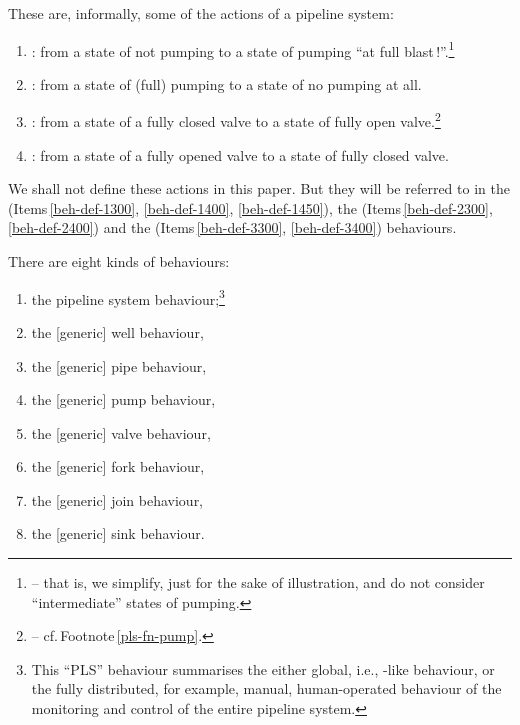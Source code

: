 \label{tehran:Actions}\LLLL

\begynd
\pind These are, informally, some of the actions of a pipeline system:
\afslut
\begin{enumerate}\setei
\item \label{pls-act-00} : from a state of not
  pumping to a state of pumping ``at full blast\,!''.\footnote{\LLLL -- \label{pls-fn-pump}
  that is, we simplify, just for the sake of illustration, and do not
  consider ``intermediate'' states of pumping.}
\item \label{pls-act-10} : from  a state of (full) pumping
  to a state of no pumping at all.
\item \label{pls-act-20} : from a state of a fully
  closed valve to a state of fully open valve.\footnote{\LLLL -- cf.\,Footnote\,\vref{pls-fn-pump}.}
\item \label{pls-act-30} : from a state of a fully opened
  valve to a state of fully closed valve.
\savei\end{enumerate}

\noindent
\begynd
\pind We shall not define these actions in this paper.
\pind But they will be referred to in the 
      (Items\,\ref{beh-def-1300}, \ref{beh-def-1400}, \ref{beh-def-1450}), the
       (Items\,\ref{beh-def-2300}, \ref{beh-def-2400})
      and the  (Items\,\ref{beh-def-3300}, \ref{beh-def-3400}) behaviours. 
\afslut

\label{tehran:Behaviours}


\begynd
\pind There are eight kinds of behaviours:
\afslut
\begin{multicols}{2}
\begin{enumerate}\setei
\item \label{ls-beh-010} the \dbeat{[overall]} pipeline system
  behaviour;\footnote{This ``PLS'' behaviour summarises the either global,
  i.e., \footnotemark-like behaviour, or the fully distributed, for example, manual,
  human-operated behaviour of the monitoring and control of the entire
  pipeline system.}
\item \label{ls-beh-020} the [generic] well behaviour,
\item \label{ls-beh-030} the [generic] pipe  behaviour,
\item \label{ls-beh-040} the [generic] pump  behaviour,
\item \label{ls-beh-050} the [generic] valve  behaviour,
\item \label{ls-beh-060} the [generic] fork  behaviour,
\item \label{ls-beh-070} the [generic] join  behaviour,
\item \label{ls-beh-080} the [generic] sink  behaviour.
\savei\end{enumerate}
\end{multicols}


